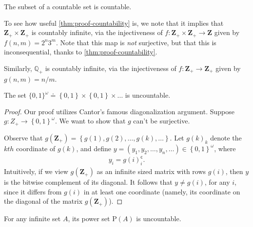 \begin{corollary}
	The subset of a countable set is countable.
\end{corollary}

To see how useful \cref{thm:proof-countability} is, we note that it implies that
$\mathbf{Z}_{+} \times \mathbf{Z}_{+}$ is countably infinite, via the injectiveness of $f:
\mathbf{Z}_{+} \times \mathbf{Z}_{+} \to \mathbf{Z}$ given by $f(n,m) = 2^{n} 3^{m}$. Note that this
map is \emph{not} surjective, but that this is inconsequential, thanks to
\cref{thm:proof-countability}.

Similarly, $\mathbb{Q}_{+}$ is countably infinite, via the injectiveness
of $f: \mathbf{Z}_{+} \to \mathbf{Z}_{+}$ given by $g(n,m) = n/m$.
\begin{theorem}\label{thm:cantor}
	The set $\{ 0,1 \}^{\omega}
	\doteq \left\{ 0,1 \right\} \times
	\left\{ 0,1 \right\} \times \dots$ is uncountable.
\end{theorem}
\begin{proof}
	Our proof utilizes Cantor's famous diagonalization argument.
	Suppose $g: Z_{+} \to \left\{ 0,1 \right\}^{\omega}$. We want to show that
	$g$ can't be surjective.

	Observe that $g(\mathbf{Z}_{+}) = \left\{ g(1), g(2), \dots, g(k), \dots \right\}$.
	Let $g(k)_{k}$ denote the $kth$ coordinate of $g(k)$, and define
	$y = (y_{1}, y_{2}, \dots, y_{n}, \dots) \in \left\{ 0,1 \right\}^{\omega}$,
	where
	\begin{equation*}
		\begin{split}
			y_{i} = g(i)_{i}^{\mathsf{c}}.
		\end{split}
	\end{equation*}
	Intuitively, if we view $g(\mathbf{Z}_{+})$ as an infinite sized matrix with rows
	$g(i)$, then $y$ is the bitwise complement of its diagonal. It follows that
	$y \neq g(i)$, for any $i$, since it differs from $g(i)$ in at least one
	coordinate (namely, its coordinate on the diagonal of the matrix
	$g(\mathbf{Z}_{+})$).
\end{proof}
\begin{corollary}
	For any infinite set $A$, its power set $\mathrm{P}(A)$ is uncountable.
\end{corollary}
